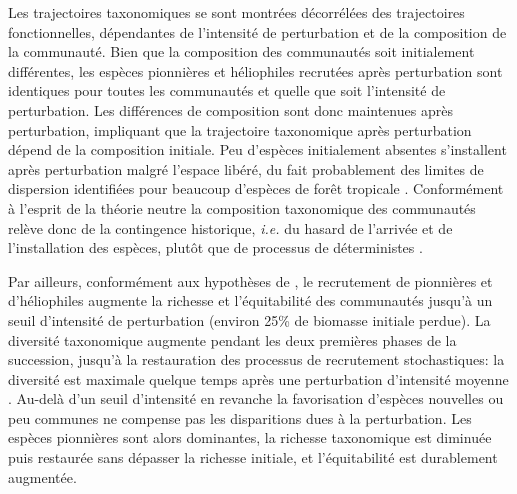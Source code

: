 \documentclass[
  11pt,
  french,
  A4paper,
  extrafontsizes,onecolumn,openright
  ]{memoir}
\begin{document}
Les trajectoires taxonomiques se sont montrées décorrélées des
trajectoires fonctionnelles, dépendantes de l'intensité de perturbation
et de la composition de la communauté. Bien que la composition des
communautés soit initialement différentes, les espèces pionnières et
héliophiles recrutées après perturbation sont identiques pour toutes les
communautés et quelle que soit l'intensité de perturbation. Les
différences de composition sont donc maintenues après perturbation,
impliquant que la trajectoire taxonomique après perturbation dépend de
la composition initiale. Peu d'espèces initialement absentes
s'installent après perturbation malgré l'espace libéré, du fait
probablement des limites de dispersion identifiées pour beaucoup
d'espèces de forêt tropicale \autocite{Svenning2005}. Conformément à
l'esprit de la théorie neutre la composition taxonomique des communautés
relève donc de la contingence historique, \emph{i.e.} du hasard de
l'arrivée et de l'installation des espèces, plutôt que de processus de
déterministes \autocite{Hubbell2001}.

Par ailleurs, conformément aux hypothèses de \textcite{Connell1978}, le
recrutement de pionnières et d'héliophiles augmente la richesse et
l'équitabilité des communautés jusqu'à un seuil d'intensité de
perturbation (environ 25\% de biomasse initiale perdue). La diversité
taxonomique augmente pendant les deux premières phases de la succession,
jusqu'à la restauration des processus de recrutement stochastiques: la
diversité est maximale quelque temps après une perturbation d'intensité
moyenne \autocites{Molino2001}{Guitet2018}. Au-delà d'un seuil
d'intensité en revanche la favorisation d'espèces nouvelles ou peu
communes ne compense pas les disparitions dues à la perturbation. Les
espèces pionnières sont alors dominantes, la richesse taxonomique est
diminuée puis restaurée sans dépasser la richesse initiale, et
l'équitabilité est durablement augmentée.
\end{document}
